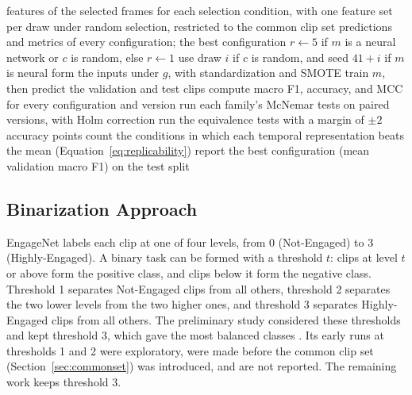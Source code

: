 \begin{algorithm}[t]
   \caption{Training and evaluation of all configurations}
   \label{alg:evaluation}
   \begin{algorithmic}[1]
      \Require features of the selected frames for each selection condition, with one feature set per draw under random selection, restricted to the common clip set
      \Ensure predictions and metrics of every configuration; the best configuration
         \State $r \gets 5$ if $m$ is a neural network or $c$ is random, else $r \gets 1$
          
            \State use draw $i$ if $c$ is random, and seed $41 + i$ if $m$ is neural
            \State form the inputs under $g$, with standardization and SMOTE
            \State train $m$, then predict the validation and test clips
         \EndFor
      \EndFor
      \State compute macro F1, accuracy, and MCC for every configuration and version
      \State run each family's McNemar tests on paired versions, with Holm correction
      \State run the equivalence tests with a margin of $\pm 2$ accuracy points
      \State count the conditions in which each temporal representation beats the mean (Equation~\ref{eq:replicability})
      \State report the best configuration (mean validation macro F1) on the test split
   \end{algorithmic}
\end{algorithm}

\subsection{Binarization Approach}
\label{sec:binarization}

EngageNet labels each clip at one of four levels, from 0 (Not-Engaged) to 3 (Highly-Engaged). A binary task can be formed with a threshold $t$: clips at level $t$ or above form the positive class, and clips below it form the negative class. Threshold 1 separates Not-Engaged clips from all others, threshold 2 separates the two lower levels from the two higher ones, and threshold 3 separates Highly-Engaged clips from all others. The preliminary study considered these thresholds and kept threshold 3, which gave the most balanced classes \cite{sityar2026icce}. Its early runs at thresholds 1 and 2 were exploratory, were made before the common clip set (Section~\ref{sec:commonset}) was introduced, and are not reported. The remaining work keeps threshold 3.


